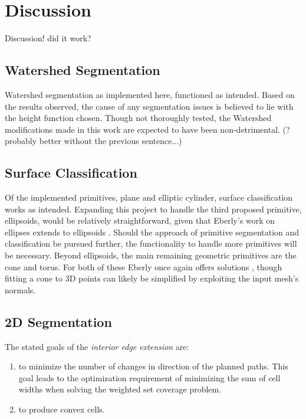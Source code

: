 \chapter{Discussion}
Discussion! did it work?

\section{Watershed Segmentation}
Watershed segmentation as implemented here, functioned as intended.
Based on the results observed, the cause of any segmentation issues is believed to lie with the height function chosen.
Though not thoroughly tested, the Watershed modifications made in this work are expected to have been non-detrimental.
(? probably better without the previous sentence...)

\section{Surface Classification}
Of the implemented primitives, plane and elliptic cylinder, surface classification works as intended.
Expanding this project to handle the third proposed primitive, ellipsoids, would be relatively straightforward, given that Eberly's work on ellipses extends to ellipsoids \cite{GeoTools_pt_to_ellipse}.
Should the approach of primitive segmentation and classification be pursued further, the functionality to handle more primitives will be necessary.
Beyond ellipsoids, the main remaining geometric primitives are the cone and torus.
For both of these Eberly once again offers solutions \cite{GeoTools_least_squares_fitting}, though fitting a cone to 3D points can likely be simplified by exploiting the input mesh's normals.

\section{2D Segmentation}
The stated goals of the \textit{interior edge extension}\cite{IntEdgeExt} are:
\begin{enumerate}
	\item to minimize the number of changes in direction of the planned paths.
		This goal leads to the optimization requirement of minimizing the sum of cell widths when solving the weighted set coverage problem.
	\item to produce convex cells.
\end{enumerate}

